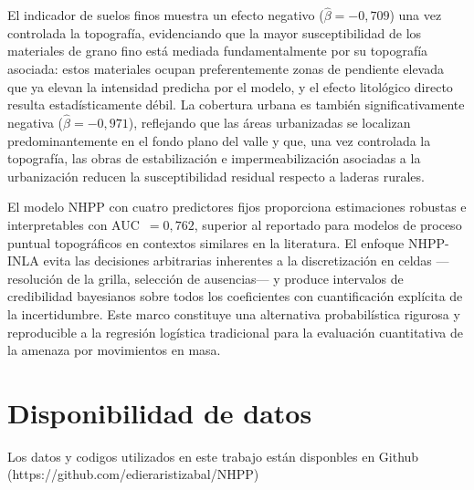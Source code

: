 \documentclass[12pt, a4paper]{article}
\begin{document}
El indicador de suelos finos muestra un efecto negativo ($\hat{\beta} = -0{,}709$)
una vez controlada la topografía, evidenciando que la mayor susceptibilidad de los materiales de grano fino está mediada fundamentalmente por su topografía asociada:
estos materiales ocupan preferentemente zonas de pendiente elevada que ya elevan la
intensidad predicha por el modelo, y el efecto litológico directo resulta estadísticamente
débil. La cobertura
urbana es también significativamente negativa ($\hat{\beta} = -0{,}971$), reflejando que
las áreas urbanizadas se localizan predominantemente en el fondo plano del valle y que,
una vez controlada la topografía, las obras de estabilización e impermeabilización
asociadas a la urbanización reducen la susceptibilidad residual respecto a laderas rurales.

El modelo NHPP con cuatro predictores fijos proporciona estimaciones robustas e
interpretables con AUC~$= 0{,}762$, superior al reportado para modelos de proceso
puntual topográficos en contextos similares en la literatura. El enfoque NHPP-INLA
evita las decisiones arbitrarias inherentes a la discretización en celdas ---resolución
de la grilla, selección de ausencias--- y produce intervalos
de credibilidad bayesianos sobre todos los coeficientes con cuantificación explícita de
la incertidumbre. Este marco constituye una alternativa probabilística rigurosa y
reproducible a la regresión logística tradicional para la evaluación cuantitativa de
la amenaza por movimientos en masa.

\section*{Disponibilidad de datos}

Los datos y codigos utilizados en este trabajo están disponbles en Github (https://github.com/edieraristizabal/NHPP)



\end{document}
